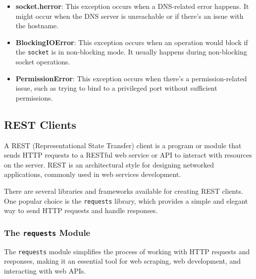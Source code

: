 \begin{itemize}
    \item \textbf{socket.herror}: This exception occurs when a DNS-related error happens. It might occur when the DNS server is unreachable or if there's an issue with the hostname.
    
    \item \textbf{BlockingIOError}: This exception occurs when an operation would block if the \texttt{socket} is in non-blocking mode. It usually happens during non-blocking socket operations.
    
    \item \textbf{PermissionError}: This exception occurs when there's a permission-related issue, such as trying to bind to a privileged port without sufficient permissions.
\end{itemize}


\newpage
\subsection{REST Clients}
A REST (Representational State Transfer) client is a program or module that sends HTTP requests to a RESTful web service or API to interact with resources on the server. REST is an architectural style for designing networked applications, commonly used in web services development.

There are several libraries and frameworks available for creating REST clients. One popular choice is the \texttt{requests} library, which provides a simple and elegant way to send HTTP requests and handle responses.

\subsubsection{The \texttt{requests} Module}
The \texttt{requests} module simplifies the process of working with HTTP requests and responses, making it an essential tool for web scraping, web development, and interacting with web APIs.

